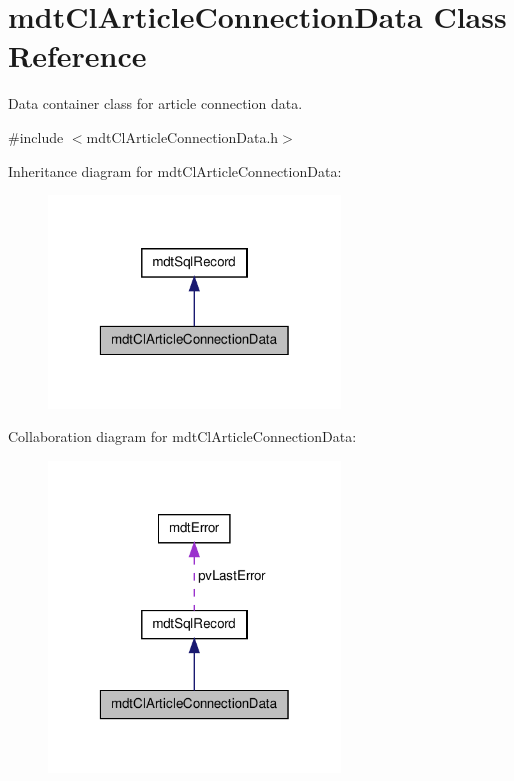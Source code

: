 \hypertarget{classmdt_cl_article_connection_data}{\section{mdt\-Cl\-Article\-Connection\-Data Class Reference}
\label{classmdt_cl_article_connection_data}
}


Data container class for article connection data.  




{\ttfamily \#include $<$mdt\-Cl\-Article\-Connection\-Data.\-h$>$}



Inheritance diagram for mdt\-Cl\-Article\-Connection\-Data\-:
\nopagebreak
\begin{figure}[H]
\begin{center}
\leavevmode
\includegraphics[width=220pt]{classmdt_cl_article_connection_data__inherit__graph}
\end{center}
\end{figure}


Collaboration diagram for mdt\-Cl\-Article\-Connection\-Data\-:
\nopagebreak
\begin{figure}[H]
\begin{center}
\leavevmode
\includegraphics[width=220pt]{classmdt_cl_article_connection_data__coll__graph}
\end{center}
\end{figure}

